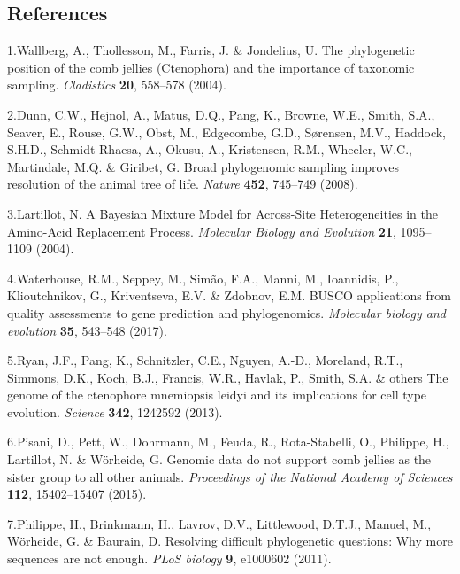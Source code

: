 \documentclass[]{article}
\begin{document}
\hypertarget{references}{%
\subsection*{References}\label{references}}

\hypertarget{refs}{}
\leavevmode\hypertarget{ref-Wallberg:2004ws}{}%
1.Wallberg, A., Thollesson, M., Farris, J. \& Jondelius, U. The
phylogenetic position of the comb jellies (Ctenophora) and the
importance of taxonomic sampling. \emph{Cladistics} \textbf{20},
558--578 (2004).

\leavevmode\hypertarget{ref-Dunn:2008ky}{}%
2.Dunn, C.W., Hejnol, A., Matus, D.Q., Pang, K., Browne, W.E., Smith,
S.A., Seaver, E., Rouse, G.W., Obst, M., Edgecombe, G.D., Sørensen,
M.V., Haddock, S.H.D., Schmidt-Rhaesa, A., Okusu, A., Kristensen, R.M.,
Wheeler, W.C., Martindale, M.Q. \& Giribet, G. Broad phylogenomic
sampling improves resolution of the animal tree of life. \emph{Nature}
\textbf{452}, 745--749 (2008).

\leavevmode\hypertarget{ref-Lartillot:2004dq}{}%
3.Lartillot, N. A Bayesian Mixture Model for Across-Site Heterogeneities
in the Amino-Acid Replacement Process. \emph{Molecular Biology and
Evolution} \textbf{21}, 1095--1109 (2004).

\leavevmode\hypertarget{ref-waterhouse2017busco}{}%
4.Waterhouse, R.M., Seppey, M., Simão, F.A., Manni, M., Ioannidis, P.,
Klioutchnikov, G., Kriventseva, E.V. \& Zdobnov, E.M. BUSCO applications
from quality assessments to gene prediction and phylogenomics.
\emph{Molecular biology and evolution} \textbf{35}, 543--548 (2017).

\leavevmode\hypertarget{ref-ryan2013genome}{}%
5.Ryan, J.F., Pang, K., Schnitzler, C.E., Nguyen, A.-D., Moreland, R.T.,
Simmons, D.K., Koch, B.J., Francis, W.R., Havlak, P., Smith, S.A. \&
others The genome of the ctenophore mnemiopsis leidyi and its
implications for cell type evolution. \emph{Science} \textbf{342},
1242592 (2013).

\leavevmode\hypertarget{ref-pisani2015genomic}{}%
6.Pisani, D., Pett, W., Dohrmann, M., Feuda, R., Rota-Stabelli, O.,
Philippe, H., Lartillot, N. \& Wörheide, G. Genomic data do not support
comb jellies as the sister group to all other animals. \emph{Proceedings
of the National Academy of Sciences} \textbf{112}, 15402--15407 (2015).

\leavevmode\hypertarget{ref-philippe2011resolving}{}%
7.Philippe, H., Brinkmann, H., Lavrov, D.V., Littlewood, D.T.J., Manuel,
M., Wörheide, G. \& Baurain, D. Resolving difficult phylogenetic
questions: Why more sequences are not enough. \emph{PLoS biology}
\textbf{9}, e1000602 (2011).
\end{document}
